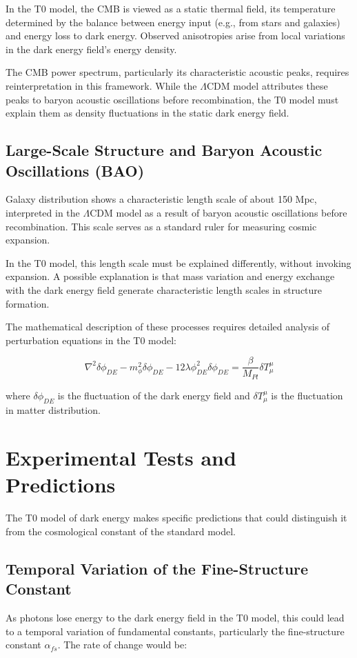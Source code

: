 \documentclass[a4paper,12pt]{article}
\theoremstyle{definition}
\theoremstyle{remark}
\begin{document}
	In the T0 model, the CMB is viewed as a static thermal field, its temperature determined by the balance between energy input (e.g., from stars and galaxies) and energy loss to dark energy. Observed anisotropies arise from local variations in the dark energy field’s energy density.
	
	The CMB power spectrum, particularly its characteristic acoustic peaks, requires reinterpretation in this framework. While the $\Lambda$CDM model attributes these peaks to baryon acoustic oscillations before recombination, the T0 model must explain them as density fluctuations in the static dark energy field.
	
	\subsection{Large-Scale Structure and Baryon Acoustic Oscillations (BAO)}
	Galaxy distribution shows a characteristic length scale of about 150 Mpc, interpreted in the $\Lambda$CDM model as a result of baryon acoustic oscillations before recombination. This scale serves as a standard ruler for measuring cosmic expansion.
	
	In the T0 model, this length scale must be explained differently, without invoking expansion. A possible explanation is that mass variation and energy exchange with the dark energy field generate characteristic length scales in structure formation.
	
	The mathematical description of these processes requires detailed analysis of perturbation equations in the T0 model:
	
	\begin{equation}
		\nabla^2 \delta\phi_{DE} - m_{\phi}^2 \delta\phi_{DE} - 12\lambda\phi_{DE}^2 \delta\phi_{DE} = \frac{\beta}{M_{Pl}}\delta T^{\mu}_{\mu}
	\end{equation}
	
	where $\delta\phi_{DE}$ is the fluctuation of the dark energy field and $\delta T^{\mu}_{\mu}$ is the fluctuation in matter distribution.
	
	\section{Experimental Tests and Predictions}
	The T0 model of dark energy makes specific predictions that could distinguish it from the cosmological constant of the standard model.
	
	\subsection{Temporal Variation of the Fine-Structure Constant}
	As photons lose energy to the dark energy field in the T0 model, this could lead to a temporal variation of fundamental constants, particularly the fine-structure constant $\alpha_{fs}$. The rate of change would be:
	
\end{document}
